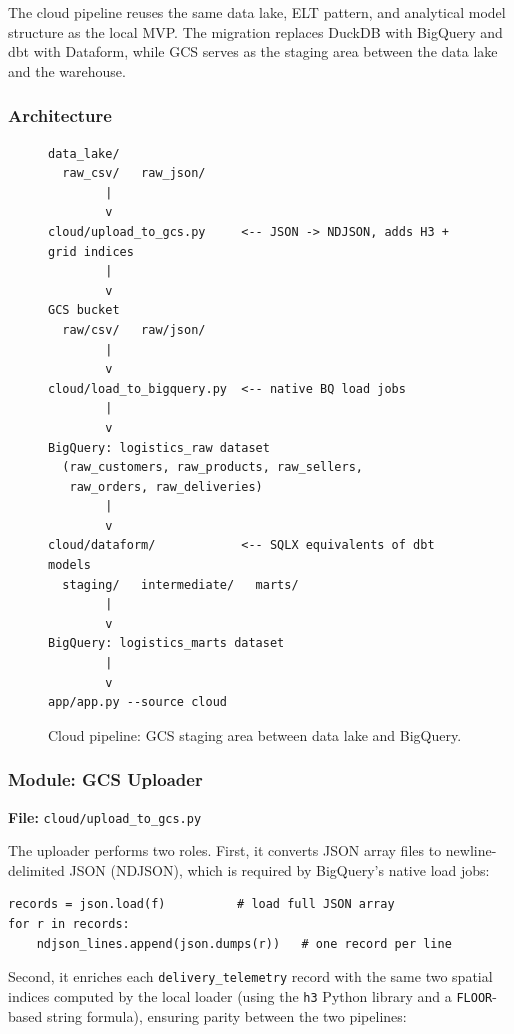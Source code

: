 The cloud pipeline reuses the same data lake, ELT pattern, and analytical model structure
as the local MVP. The migration replaces DuckDB with BigQuery and dbt with Dataform,
while GCS serves as the staging area between the data lake and the warehouse.

\subsubsection{Architecture}

\begin{figure}[H]
\centering
\begin{verbatim}
data_lake/
  raw_csv/   raw_json/
        |
        v
cloud/upload_to_gcs.py     <-- JSON -> NDJSON, adds H3 + grid indices
        |
        v
GCS bucket
  raw/csv/   raw/json/
        |
        v
cloud/load_to_bigquery.py  <-- native BQ load jobs
        |
        v
BigQuery: logistics_raw dataset
  (raw_customers, raw_products, raw_sellers,
   raw_orders, raw_deliveries)
        |
        v
cloud/dataform/            <-- SQLX equivalents of dbt models
  staging/   intermediate/   marts/
        |
        v
BigQuery: logistics_marts dataset
        |
        v
app/app.py --source cloud
\end{verbatim}
\caption{Cloud pipeline: GCS staging area between data lake and BigQuery.}
\label{fig:cloud_pipeline}
\end{figure}

\subsubsection{Module: GCS Uploader}
\label{sec:gcs_uploader}

\textbf{File:} \texttt{cloud/upload\_to\_gcs.py}

The uploader performs two roles. First, it converts JSON array files to
newline-delimited JSON (NDJSON), which is required by BigQuery's native load jobs:

\begin{verbatim}
records = json.load(f)          # load full JSON array
for r in records:
    ndjson_lines.append(json.dumps(r))   # one record per line
\end{verbatim}

Second, it enriches each \texttt{delivery\_telemetry} record with the same two spatial
indices computed by the local loader (using the \texttt{h3} Python library and a
\texttt{FLOOR}-based string formula), ensuring parity between the two pipelines:

